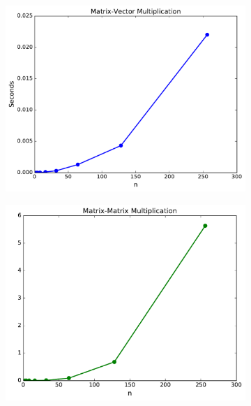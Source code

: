 \begin{problem}
\begin{figure}[H] %
\captionsetup[subfigure]{justification=centering}
\centering
\begin{subfigure}{.5\textwidth}
    \centering
    \includegraphics[width=\linewidth]{matrixVectorMultiplication.pdf}
\end{subfigure}%
\begin{subfigure}{.474\textwidth}
    \centering
    \includegraphics[width=\linewidth]{matrixMatrixMultiplication.pdf}
\end{subfigure}
\end{figure}

\label{prob:matrix-multiplication-timing}
\end{problem}

